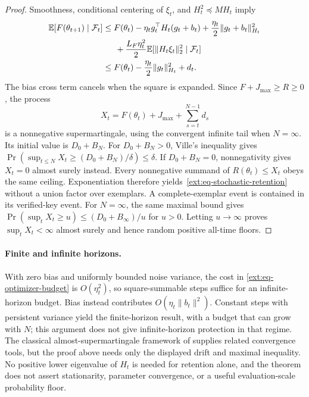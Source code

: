\documentclass{article}
\newcommand{\1}{\mathbf 1}
\theoremstyle{remark}
\theoremstyle{definition}
\theoremstyle{plain}
\begin{document}
\begin{proof}
Smoothness, conditional centering of $\xi_t$, and
$H_t^2\preceq MH_t$ imply
\begin{align*}
 \mathbb E[F(\theta_{t+1})\mid\mathcal F_t]
 &\le F(\theta_t)-\eta_tg_t^\top H_t(g_t+b_t)
       +\frac{\eta_t}{2}\|g_t+b_t\|_{H_t}^2\\
 &\hspace{1.5em}+\frac{L_F\eta_t^2}{2}
          \mathbb E[\|H_t\xi_t\|_2^2\mid\mathcal F_t]\\
 &\le F(\theta_t)-\frac{\eta_t}{2}\|g_t\|_{H_t}^2+d_t.
\end{align*}
The bias cross term cancels when the square is expanded. Since
$F+J_{\max}\ge R\ge0$, the process
\[
 X_t=F(\theta_t)+J_{\max}+\sum_{s=t}^{N-1}d_s
\]
is a nonnegative supermartingale, using the convergent infinite tail when
$N=\infty$. Its initial value is $D_0+B_N$. For $D_0+B_N>0$, Ville's
inequality gives
$\Pr(\sup_{t\le N}X_t\ge(D_0+B_N)/\delta)\le\delta$.
If $D_0+B_N=0$, nonnegativity gives $X_t=0$ almost surely instead.
Every nonnegative summand of $R(\theta_t)\le X_t$ obeys the same ceiling.
Exponentiation therefore yields~\eqref{ext:eq-stochastic-retention}
without a union factor over exemplars. A complete-exemplar event is contained
in its verified-key event. For $N=\infty$, the same maximal bound gives
$\Pr(\sup_tX_t\ge u)\le(D_0+B_\infty)/u$ for $u>0$.
Letting $u\to\infty$ proves $\sup_tX_t<\infty$ almost surely and hence
random positive all-time floors.
\end{proof}

\paragraph{Finite and infinite horizons.}
With zero bias and uniformly bounded noise variance, the cost in
\eqref{ext:eq-optimizer-budget} is $O(\eta_t^2)$, so square-summable steps
suffice for an infinite-horizon budget. Bias instead contributes
$O(\eta_t\|b_t\|^2)$. Constant steps with persistent variance yield the
finite-horizon result, with a budget that can grow with $N$; this argument
does not give infinite-horizon protection in that regime. The classical
almost-supermartingale framework of \citet{robbins1971almost} supplies
related convergence tools, but the proof above needs only the displayed
drift and maximal inequality. No positive lower eigenvalue of $H_t$ is
needed for retention alone, and the theorem does not assert stationarity,
parameter convergence, or a useful evaluation-scale probability floor.
\end{document}
